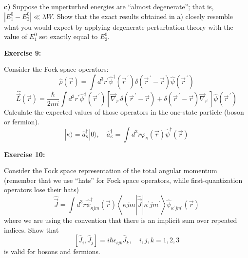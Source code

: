 \documentclass[12pt]{article}
\begin{document}
\textbf{c)} Suppose the unperturbed energies are ``almost degenerate''; that is, $\left|E_{1}^{0}-E_{2}^{0}\right| \ll \lambda W$. Show
that the exact results obtained in a) closely resemble what you would expect by applying
degenerate perturbation theory with the value of $E_{1}^{0}$ set exactly equal to $E_{2}^{0}$.


\textbf{Exercise 9:} 

Consider the Fock space operators:
\[
\hat{\rho}(\vec{r})=\int d^{3} r^{\prime} \hat{\psi}^{\dagger}\left(\vec{r}^{\,\prime}\right) \delta\left(\vec{r}^{\,\prime}-\vec{r}\right) \hat{\psi}\left(\vec{r}^{\,\prime}\right)
\]
\[
\hat{\vec{L}}(\vec{r})=\frac{\hbar}{2 m i} \int d^{3} r^{\prime} \hat{\psi}^{\dagger}\left(\vec{r}^{\,\prime}\right)\left[\vec{\nabla}_{r^{\prime}} \delta\left(\vec{r}^{\,\prime}-\vec{r}\right)+\delta\left(\vec{r}^{\,\prime}-\vec{r}\right) \vec{\nabla}_{r^{\prime}}\right] \hat{\psi}\left(\vec{r}^{\,\prime}\right)
\]
Calculate the expected values of those operators in the one-state particle (boson or fermion).
\[
|\kappa\rangle=\hat{a}_{\kappa}^{\dagger}|0\rangle, \quad \hat{a}_{\kappa}^{\dagger}=\int d^{3} r \varphi_{\kappa}(\vec{r}) \hat{\psi}^{\dagger}(\vec{r})
\]

\textbf{Exercise 10:} 

Consider the Fock space representation of the total angular momentum
(remember that we use ``hats'' for Fock space operators, while first-quantization operators lose their hats)
\[
\hat{\vec{J}}=\int d^{3} r \hat{\psi}_{\kappa j m}^{\dagger}(\vec{r})\left\langle\kappa j m|\hat{\vec{J}}| \kappa^{\prime} j m^{\prime}\right\rangle \hat{\psi}_{\kappa^{\prime} j m^{\prime}}(\vec{r})
\]
where we are using the convention that there is an implicit sum over repeated indices. Show that
\[
\left[\hat{J}_{i}, \hat{J}_{j}\right]=i \hbar \epsilon_{i j k} \hat{J}_{k}, \quad i, j, k=1,2,3
\]
is valid for bosons and fermions.
\end{document}
